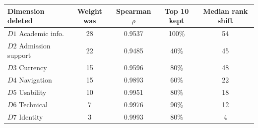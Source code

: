\begin{tabular}{lcccc}
\toprule
\textbf{Dimension deleted} & \textbf{Weight was} & \textbf{Spearman $\rho$} & \textbf{Top 10 kept} & \textbf{Median rank shift} \\
\midrule
$D1$ Academic info. & 28 & 0.9537 & 100\% & 54 \\
$D2$ Admission support & 22 & 0.9485 & 40\% & 45 \\
$D3$ Currency & 15 & 0.9596 & 80\% & 48 \\
$D4$ Navigation & 15 & 0.9893 & 60\% & 22 \\
$D5$ Usability & 10 & 0.9951 & 80\% & 18 \\
$D6$ Technical & 7 & 0.9976 & 90\% & 12 \\
$D7$ Identity & 3 & 0.9993 & 80\% & 4 \\
\bottomrule
\end{tabular}
